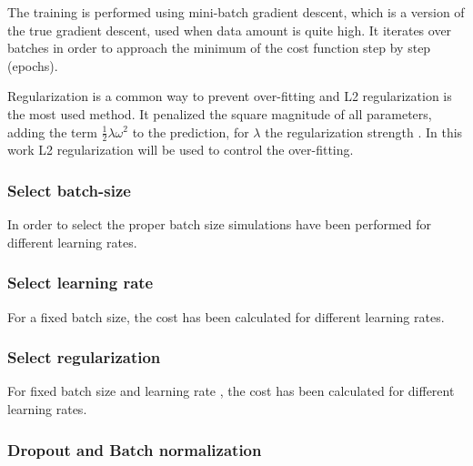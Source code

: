 \documentclass[]{article}
\begin{document}
The training is performed using mini-batch gradient descent, which is a version of the true gradient descent, used when data amount is quite high. It iterates over batches in order to approach the minimum of the cost function step by step (epochs).

Regularization is a common way to prevent over-fitting and L2 regularization is the most used method. It penalized the square magnitude of all parameters, adding the term $\frac{1}{2}\lambda \omega ^2$ to the prediction, for $\lambda$ the regularization strength \cite{cs231convnets}. In this work L2 regularization will be used to control the over-fitting.

\subsubsection{Select batch-size}
In order to select the proper batch size simulations have been performed for different learning rates.

\subsubsection{Select learning rate}
For a fixed batch size, the cost has been calculated for different learning rates.

\subsubsection{Select regularization}
For fixed batch size and learning rate , the cost has been calculated for different learning rates.

\subsubsection{Dropout and Batch normalization}


 
\pagebreak



\end{document}
